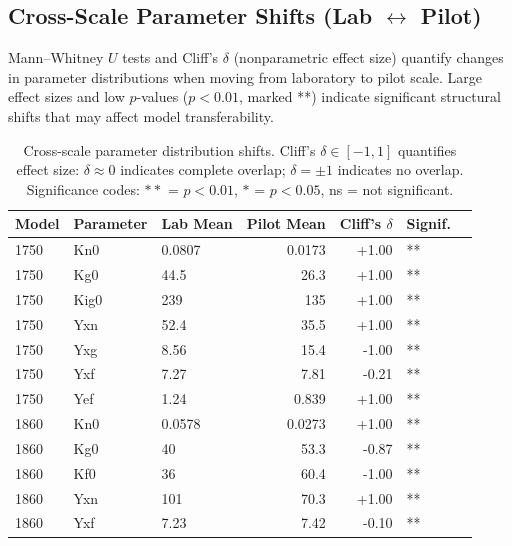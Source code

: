 \vspace{12pt}

\subsection*{Cross-Scale Parameter Shifts (Lab $\leftrightarrow$ Pilot)}

Mann--Whitney $U$ tests and Cliff's $\delta$ (nonparametric effect size) quantify changes in parameter 
distributions when moving from laboratory to pilot scale. Large effect sizes and low $p$-values 
($p < 0.01$, marked **) indicate significant structural shifts that may affect model transferability.

\begin{table}[H]\centering
\small
\caption{Cross-scale parameter distribution shifts. Cliff's $\delta \in [-1, 1]$ quantifies effect size: 
$\delta \approx 0$ indicates complete overlap; $\delta = \pm 1$ indicates no overlap. 
Significance codes: $**$ = $p < 0.01$, $*$ = $p < 0.05$, ns = not significant.}
\label{tab:SI_X_2_param_transfer}
\begin{tabular}{lllrrll}
\toprule
\textbf{Model} & \textbf{Parameter} & \textbf{Lab Mean} & \textbf{Pilot Mean} & 
\textbf{Cliff's $\delta$} & \textbf{Signif.} \\
\midrule
1750 & Kn0 &       0.0807 &       0.0173 &       +1.00 &       ** \\
1750 & Kg0 &         44.5 &         26.3 &       +1.00 &       ** \\
1750 & Kig0 &          239 &          135 &       +1.00 &       ** \\
1750 & Yxn &         52.4 &         35.5 &       +1.00 &       ** \\
1750 & Yxg &         8.56 &         15.4 &       -1.00 &       ** \\
1750 & Yxf &         7.27 &         7.81 &       -0.21 &       ** \\
1750 & Yef &         1.24 &        0.839 &       +1.00 &       ** \\
1860 & Kn0 &       0.0578 &       0.0273 &       +1.00 &       ** \\
1860 & Kg0 &           40 &         53.3 &       -0.87 &       ** \\
1860 & Kf0 &           36 &         60.4 &       -1.00 &       ** \\
1860 & Yxn &          101 &         70.3 &       +1.00 &       ** \\
1860 & Yxf &         7.23 &         7.42 &       -0.10 &       ** \\

\end{tabular}
\end{table}
